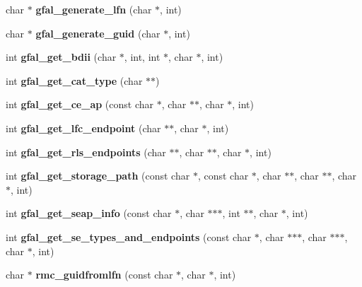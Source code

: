 \begin{CompactItemize}
\item 
char $\ast$ \textbf{gfal\_\-generate\_\-lfn} (char $\ast$, int)\label{group__internal__group_gcd48b57bf9659be5204319918c6f9d20}

\item 
char $\ast$ \textbf{gfal\_\-generate\_\-guid} (char $\ast$, int)\label{group__internal__group_g8311ede197e204e57029165fbc3898d6}

\item 
int \textbf{gfal\_\-get\_\-bdii} (char $\ast$, int, int $\ast$, char $\ast$, int)\label{group__internal__group_gc5a167111fbd4564bdbd7a194a8ebbad}

\item 
int \textbf{gfal\_\-get\_\-cat\_\-type} (char $\ast$$\ast$)\label{group__internal__group_gc08ad608f2ca57ec2883c799a3b6bf11}

\item 
int \textbf{gfal\_\-get\_\-ce\_\-ap} (const char $\ast$, char $\ast$$\ast$, char $\ast$, int)\label{group__internal__group_ged7eddae06a6ae76e7835ad89069f23f}

\item 
int \textbf{gfal\_\-get\_\-lfc\_\-endpoint} (char $\ast$$\ast$, char $\ast$, int)\label{group__internal__group_g6b5c96e786925f6ad93fa57f998173cc}

\item 
int \textbf{gfal\_\-get\_\-rls\_\-endpoints} (char $\ast$$\ast$, char $\ast$$\ast$, char $\ast$, int)\label{group__internal__group_ge98063cb83cedc1a6e6fe0ef8d35c447}

\item 
int \textbf{gfal\_\-get\_\-storage\_\-path} (const char $\ast$, const char $\ast$, char $\ast$$\ast$, char $\ast$$\ast$, char $\ast$, int)\label{group__internal__group_gb3f2c6e488fd2ede0d16bd7f4cdd3549}

\item 
int \textbf{gfal\_\-get\_\-seap\_\-info} (const char $\ast$, char $\ast$$\ast$$\ast$, int $\ast$$\ast$, char $\ast$, int)\label{group__internal__group_ge114394c3fd91f2ab9382dd884dd0693}

\item 
int \textbf{gfal\_\-get\_\-se\_\-types\_\-and\_\-endpoints} (const char $\ast$, char $\ast$$\ast$$\ast$, char $\ast$$\ast$$\ast$, char $\ast$, int)\label{group__internal__group_g2c87f70238deffb3907d5a612e847fd4}

\item 
char $\ast$ \textbf{rmc\_\-guidfromlfn} (const char $\ast$, char $\ast$, int)\label{group__internal__group_g83a423ba6bb37eda1d1e9fe70cefeea0}


\end{CompactItemize}
